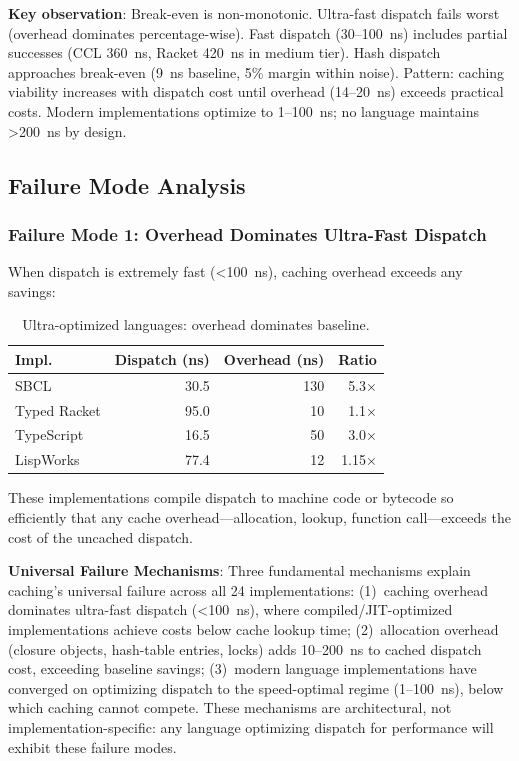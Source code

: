 \documentclass[sigplan,final,acmsmall,review,screen]{acmart}
\begin{document}
\textbf{Key observation}: Break-even is non-monotonic. Ultra-fast dispatch fails worst (overhead dominates percentage-wise). Fast dispatch (30--100~ns) includes partial successes (CCL 360~ns, Racket 420~ns in medium tier). Hash dispatch approaches break-even (9~ns baseline, 5\% margin within noise). Pattern: caching viability increases with dispatch cost until overhead (14--20~ns) exceeds practical costs. Modern implementations optimize to 1--100~ns; no language maintains >200~ns by design.

\subsection{Failure Mode Analysis}

\subsubsection{Failure Mode 1: Overhead Dominates Ultra-Fast Dispatch}

When dispatch is extremely fast (<100~ns), caching overhead exceeds any savings:

\begin{table}[h!]
\centering
\small
\caption{Ultra-optimized languages: overhead dominates baseline.}
\label{tab:mode1}
\begin{tabular}{@{}lrrr@{}}
\toprule
\textbf{Impl.} & \textbf{Dispatch (ns)} & \textbf{Overhead (ns)} & \textbf{Ratio} \\
\midrule
SBCL & 30.5 & 130 & 5.3× \\
Typed Racket & 95.0 & 10 & 1.1× \\
TypeScript & 16.5 & 50 & 3.0× \\
LispWorks & 77.4 & 12 & 1.15× \\
\bottomrule
\end{tabular}
\end{table}

These implementations compile dispatch to machine code or bytecode so efficiently that any
cache overhead—allocation, lookup, function call—exceeds the cost of the uncached dispatch.

\textbf{Universal Failure Mechanisms}: Three fundamental mechanisms explain caching's universal failure across all 24 implementations:
(1)~caching overhead dominates ultra-fast dispatch (<100~ns), where compiled/JIT-optimized implementations achieve costs below cache lookup time;
(2)~allocation overhead (closure objects, hash-table entries, locks) adds 10--200~ns to cached dispatch cost, exceeding baseline savings;
(3)~modern language implementations have converged on optimizing dispatch to the speed-optimal regime (1--100~ns), below which caching cannot compete.
These mechanisms are architectural, not implementation-specific: any language optimizing dispatch for performance will exhibit these failure modes.
\end{document}
